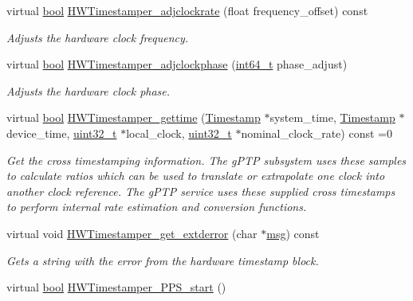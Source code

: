 \begin{DoxyCompactItemize}
virtual \hyperlink{avb__gptp_8h_af6a258d8f3ee5206d682d799316314b1}{bool} \hyperlink{class_common_timestamper_a557b905a4f8bb20481c28c8dd33cfb21}{H\+W\+Timestamper\+\_\+adjclockrate} (float frequency\+\_\+offset) const 
\begin{DoxyCompactList}\small\item\em Adjusts the hardware clock frequency. \end{DoxyCompactList}\item 
virtual \hyperlink{avb__gptp_8h_af6a258d8f3ee5206d682d799316314b1}{bool} \hyperlink{class_common_timestamper_aa9470ea1623c3718913fbff1c55e3115}{H\+W\+Timestamper\+\_\+adjclockphase} (\hyperlink{parse_8c_a67a9885ef4908cb72ce26d75b694386c}{int64\+\_\+t} phase\+\_\+adjust)
\begin{DoxyCompactList}\small\item\em Adjusts the hardware clock phase. \end{DoxyCompactList}\item 
virtual \hyperlink{avb__gptp_8h_af6a258d8f3ee5206d682d799316314b1}{bool} \hyperlink{class_common_timestamper_a10b54d66a60067c0084748f955164073}{H\+W\+Timestamper\+\_\+gettime} (\hyperlink{class_timestamp}{Timestamp} $\ast$system\+\_\+time, \hyperlink{class_timestamp}{Timestamp} $\ast$device\+\_\+time, \hyperlink{parse_8c_a6eb1e68cc391dd753bc8ce896dbb8315}{uint32\+\_\+t} $\ast$local\+\_\+clock, \hyperlink{parse_8c_a6eb1e68cc391dd753bc8ce896dbb8315}{uint32\+\_\+t} $\ast$nominal\+\_\+clock\+\_\+rate) const =0
\begin{DoxyCompactList}\small\item\em Get the cross timestamping information. The g\+P\+TP subsystem uses these samples to calculate ratios which can be used to translate or extrapolate one clock into another clock reference. The g\+P\+TP service uses these supplied cross timestamps to perform internal rate estimation and conversion functions. \end{DoxyCompactList}\item 
virtual void \hyperlink{class_common_timestamper_a3b26113436dec73775d2cbc523a6e074}{H\+W\+Timestamper\+\_\+get\+\_\+extderror} (char $\ast$\hyperlink{openavb__log_8c_a0c7e58a50354c4a4d6dad428d0e47029}{msg}) const 
\begin{DoxyCompactList}\small\item\em Gets a string with the error from the hardware timestamp block. \end{DoxyCompactList}\item 
virtual \hyperlink{avb__gptp_8h_af6a258d8f3ee5206d682d799316314b1}{bool} \hyperlink{class_common_timestamper_a2cbaeb84807ca61af0bc56bcc475468d}{H\+W\+Timestamper\+\_\+\+P\+P\+S\+\_\+start} ()

\end{DoxyCompactItemize}
